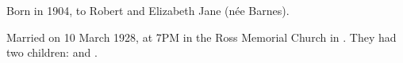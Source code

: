 
Born in  1904, to Robert and Elizabeth Jane (n\'{e}e Barnes).\cite{BMD_WA_birth_1904}

Married  on 10 March 1928,\cite{WestAust1928}
at 7PM in the Ross Memorial Church in .
They had two children:  and .
